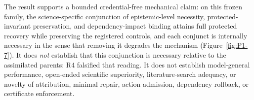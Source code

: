 The result supports a bounded credential-free mechanical claim: on this frozen
family, the science-specific conjunction of epistemic-level necessity,
protected-invariant preservation, and dependency-impact binding attains full
protected recovery while preserving the registered controls, and each conjunct is
internally necessary in the sense that removing it degrades the mechanism
(Figure~\ref{fig:P1-7}). It does \emph{not} establish that this conjunction is
necessary relative to the assimilated parents: R4 falsified that reading. It does
not establish model-general performance,
open-ended scientific superiority, literature-search adequacy, or novelty of
attribution, minimal repair, action admission, dependency rollback, or
certificate enforcement.
